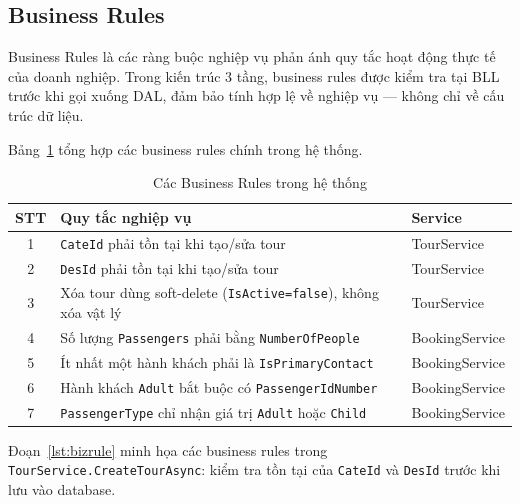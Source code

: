 \subsection{Business Rules}\label{sub3.3.2}

\begin{de}\label{def3.5}
Business Rules là các ràng buộc nghiệp vụ phản ánh quy tắc
hoạt động thực tế của doanh nghiệp. Trong kiến trúc 3 tầng,
business rules được kiểm tra tại BLL trước khi gọi xuống DAL,
đảm bảo tính hợp lệ về nghiệp vụ — không chỉ về cấu trúc dữ liệu.
\end{de}

Bảng~\ref{table:bizrules} tổng hợp các business rules
chính trong hệ thống.

\begin{table}[H]
  \begin{center}
    \begin{tabular}{|c|l|l|}
      \hline
      \textbf{STT} & \textbf{Quy tắc nghiệp vụ} & \textbf{Service} \\
      \hline
      1 & \texttt{CateId} phải tồn tại khi tạo/sửa tour
        & TourService \\
      2 & \texttt{DesId} phải tồn tại khi tạo/sửa tour
        & TourService \\
      3 & Xóa tour dùng soft-delete (\texttt{IsActive=false}),
          không xóa vật lý & TourService \\
      4 & Số lượng \texttt{Passengers} phải bằng
          \texttt{NumberOfPeople} & BookingService \\
      5 & Ít nhất một hành khách phải là
          \texttt{IsPrimaryContact} & BookingService \\
      6 & Hành khách \texttt{Adult} bắt buộc có
          \texttt{PassengerIdNumber} & BookingService \\
      7 & \texttt{PassengerType} chỉ nhận giá trị
          \texttt{Adult} hoặc \texttt{Child} & BookingService \\
      \hline
    \end{tabular}
  \end{center}
  \caption{Các Business Rules trong hệ thống}
  \label{table:bizrules}
\end{table}

Đoạn~\ref{lst:bizrule} minh họa các business rules trong
\texttt{TourService.CreateTourAsync}: kiểm tra tồn tại của
\texttt{CateId} và \texttt{DesId} trước khi lưu vào database.

